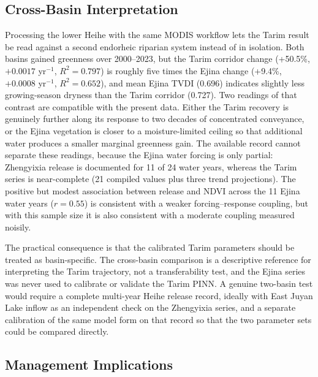 \documentclass[preprint,review,12pt,3p]{elsarticle}
\begin{document}
	\subsection{Cross-Basin Interpretation}

	Processing the lower Heihe with the same MODIS workflow lets the Tarim result be read against a second endorheic riparian system instead of in isolation. Both basins gained greenness over 2000--2023, but the Tarim corridor change (+50.5\%, $+0.0017$ yr$^{-1}$, $R^2=0.797$) is roughly five times the Ejina change (+9.4\%, $+0.0008$ yr$^{-1}$, $R^2=0.652$), and mean Ejina TVDI (0.696) indicates slightly less growing-season dryness than the Tarim corridor (0.727). Two readings of that contrast are compatible with the present data. Either the Tarim recovery is genuinely further along its response to two decades of concentrated conveyance, or the Ejina vegetation is closer to a moisture-limited ceiling so that additional water produces a smaller marginal greenness gain. The available record cannot separate these readings, because the Ejina water forcing is only partial: Zhengyixia release is documented for 11 of 24 water years, whereas the Tarim series is near-complete (21 compiled values plus three trend projections). The positive but modest association between release and NDVI across the 11 Ejina water years ($r=0.55$) is consistent with a weaker forcing--response coupling, but with this sample size it is also consistent with a moderate coupling measured noisily.

	The practical consequence is that the calibrated Tarim parameters should be treated as basin-specific. The cross-basin comparison is a descriptive reference for interpreting the Tarim trajectory, not a transferability test, and the Ejina series was never used to calibrate or validate the Tarim PINN. A genuine two-basin test would require a complete multi-year Heihe release record, ideally with East Juyan Lake inflow as an independent check on the Zhengyixia series, and a separate calibration of the same model form on that record so that the two parameter sets could be compared directly.
	
	\subsection{Management Implications}
	
\end{document}
